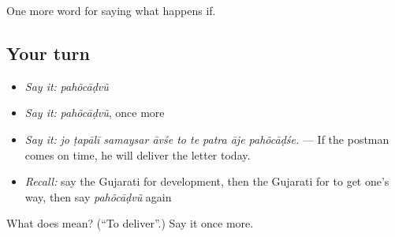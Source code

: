 \begin{grammarlens}[title={What you've built}]
One more word for saying what happens if.
\end{grammarlens}

\subsection*{Your turn}
\begin{itemize}
\raggedright
  \item \emph{Say it:} \emph{pahõcāḍvũ}
  \item \emph{Say it:} \emph{pahõcāḍvũ}, once more
  \item \emph{Say it:} \emph{jo ṭapālī samaysar āvśe to te patra āje pahõcāḍśe.} — If the postman comes on time, he will deliver the letter today.
  \item \emph{Recall:} say the Gujarati for development, then the Gujarati for to get one's way, then say \emph{pahõcāḍvũ} again
\end{itemize}

\begin{tcolorbox}[breakable,colback=teal!4,colframe=teal!35!black,title={Before you move on}]
What does  mean? (\textquotedblleft{}To deliver\textquotedblright{}.) Say it once more.
\end{tcolorbox}
